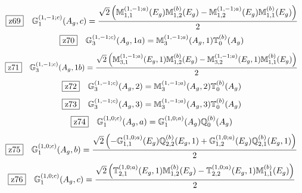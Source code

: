 \documentclass[fleqn,10pt,landscape]{jsarticle}
\begin{document}
\begin{dmath*}
\hspace*{3mm}\fbox{z69}\quad \mathbb{G}_{1}^{(1,-1;c)}(A_{g},c)=\frac{\sqrt{2} \left(\mathbb{M}_{1,1}^{(1,-1;a)}(E_{g}) \mathbb{M}_{1,2}^{(b)}(E_{g}) - \mathbb{M}_{1,2}^{(1,-1;a)}(E_{g}) \mathbb{M}_{1,1}^{(b)}(E_{g})\right)}{2}
\end{dmath*}
\begin{dmath*}
\hspace*{3mm}\fbox{z70}\quad \mathbb{G}_{3}^{(1,-1;c)}(A_{g},1a)=\mathbb{M}_{3}^{(1,-1;a)}(A_{g},1) \mathbb{T}_{0}^{(b)}(A_{g})
\end{dmath*}
\begin{dmath*}
\hspace*{3mm}\fbox{z71}\quad \mathbb{G}_{3}^{(1,-1;c)}(A_{g},1b)=\frac{\sqrt{2} \left(\mathbb{M}_{3,1}^{(1,-1;a)}(E_{g},1) \mathbb{M}_{1,2}^{(b)}(E_{g}) - \mathbb{M}_{3,2}^{(1,-1;a)}(E_{g},1) \mathbb{M}_{1,1}^{(b)}(E_{g})\right)}{2}
\end{dmath*}
\begin{dmath*}
\hspace*{3mm}\fbox{z72}\quad \mathbb{G}_{3}^{(1,-1;c)}(A_{g},2)=\mathbb{M}_{3}^{(1,-1;a)}(A_{g},2) \mathbb{T}_{0}^{(b)}(A_{g})
\end{dmath*}
\begin{dmath*}
\hspace*{3mm}\fbox{z73}\quad \mathbb{G}_{3}^{(1,-1;c)}(A_{g},3)=\mathbb{M}_{3}^{(1,-1;a)}(A_{g},3) \mathbb{T}_{0}^{(b)}(A_{g})
\end{dmath*}
\begin{dmath*}
\hspace*{3mm}\fbox{z74}\quad \mathbb{G}_{1}^{(1,0;c)}(A_{g},a)=\mathbb{G}_{1}^{(1,0;a)}(A_{g}) \mathbb{Q}_{0}^{(b)}(A_{g})
\end{dmath*}
\begin{dmath*}
\hspace*{3mm}\fbox{z75}\quad \mathbb{G}_{1}^{(1,0;c)}(A_{g},b)=\frac{\sqrt{2} \left(- \mathbb{G}_{1,1}^{(1,0;a)}(E_{g}) \mathbb{Q}_{2,2}^{(b)}(E_{g},1) + \mathbb{G}_{1,2}^{(1,0;a)}(E_{g}) \mathbb{Q}_{2,1}^{(b)}(E_{g},1)\right)}{2}
\end{dmath*}
\begin{dmath*}
\hspace*{3mm}\fbox{z76}\quad \mathbb{G}_{1}^{(1,0;c)}(A_{g},c)=\frac{\sqrt{2} \left(\mathbb{T}_{2,1}^{(1,0;a)}(E_{g},1) \mathbb{M}_{1,2}^{(b)}(E_{g}) - \mathbb{T}_{2,2}^{(1,0;a)}(E_{g},1) \mathbb{M}_{1,1}^{(b)}(E_{g})\right)}{2}
\end{dmath*}
\end{document}
